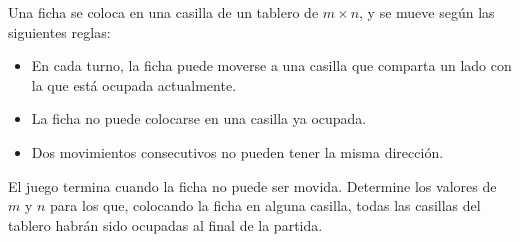 Una ficha se coloca en una casilla de un tablero de $m\times n$, y se mueve según las siguientes reglas:

\begin{itemize}
    \item En cada turno, la ficha puede moverse a una casilla que comparta un lado con la que está ocupada actualmente.
    \item La ficha no puede colocarse en una casilla ya ocupada. 
    \item Dos movimientos consecutivos no pueden tener la misma dirección.
\end{itemize}
El juego termina cuando la ficha no puede ser movida. Determine los valores de $m$ y $n$ para los que, colocando la ficha en alguna casilla, todas las casillas del tablero habrán sido ocupadas al final de la partida.
